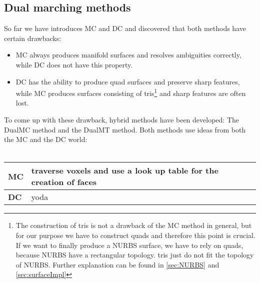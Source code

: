 \subsection{Dual marching methods}
So far we have introduces \ac{MC} and \ac{DC} and discovered that both methods have certain drawbacks:
\begin{itemize}
\item \ac{MC} always produces manifold surfaces and resolves ambiguities correctly, while \ac{DC} does not have this property.
\item \ac{DC} has the ability to produce \ac{quad} surfaces and preserve sharp features, while \ac{MC} produces surfaces consisting of \acp{tri}\footnote{The construction of \acp{tri} is not a drawback of the \ac{MC} method in general, but for our purpose we have to construct \acp{quad} and therefore this point is crucial. If we want to finally produce a \ac{NURBS} surface, we have to rely on \acp{quad}, because \ac{NURBS} have a rectangular topology. \Acp{tri} just do not fit the topology of \ac{NURBS}. Further explanation can be found in \autoref{sec:NURBS} and \autoref{sec:surfaceImpl}} and sharp features are often lost.
\end{itemize}
To come up with these drawback, hybrid methods have been developed: The \acf{DualMC} method and the \acf{DualMT} method. Both methods use ideas from both the \ac{MC} and the \ac{DC} world:
\\
\\
\begin{tabular}{l|l}
\textbf{\ac{MC}} 	& traverse voxels and use a look up table for the creation of faces
					 \\ \hline
\textbf{\ac{DC}} & yoda
\end{tabular}



